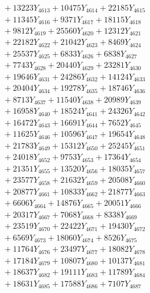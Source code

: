 \documentclass[a4paper,10pt]{article}
\begin{document}
{\begin{align}
&\;  + 13223 Y_{4613} + 10475 Y_{4614} + 22185 Y_{4615} \\[0.3ex]
&\;  + 11345 Y_{4616} + 9371 Y_{4617} + 18115 Y_{4618} \\[0.5ex]\allowbreak
&\;  + 9812 Y_{4619} + 25560 Y_{4620} + 12312 Y_{4621} \\[0.3ex]
&\;  + 22182 Y_{4622} + 21042 Y_{4623} + 8469 Y_{4624} \\[0.3ex]
&\;  + 25537 Y_{4625} + 6833 Y_{4626} + 6838 Y_{4627} \\[0.3ex]
&\;  + 7743 Y_{4628} + 20440 Y_{4629} + 23281 Y_{4630} \\[0.3ex]
&\;  + 19646 Y_{4631} + 24286 Y_{4632} + 14124 Y_{4633} \\[0.3ex]
&\;  + 20404 Y_{4634} + 19278 Y_{4635} + 18746 Y_{4636} \\[0.3ex]
&\;  + 8713 Y_{4637} + 11540 Y_{4638} + 20989 Y_{4639} \\[0.3ex]
&\;  + 16958 Y_{4640} + 18524 Y_{4641} + 24326 Y_{4642} \\[0.3ex]
&\;  + 16472 Y_{4643} + 16691 Y_{4644} + 7652 Y_{4645} \\[0.3ex]
&\;  + 11625 Y_{4646} + 10596 Y_{4647} + 19654 Y_{4648} \\[0.5ex]\allowbreak
&\;  + 21783 Y_{4649} + 15312 Y_{4650} + 25245 Y_{4651} \\[0.3ex]
&\;  + 24018 Y_{4652} + 9753 Y_{4653} + 17364 Y_{4654} \\[0.3ex]
&\;  + 21351 Y_{4655} + 13520 Y_{4656} + 18035 Y_{4657} \\[0.3ex]
&\;  + 23577 Y_{4658} + 21632 Y_{4659} + 20508 Y_{4660} \\[0.3ex]
&\;  + 20877 Y_{4661} + 10833 Y_{4662} + 21877 Y_{4663} \\[0.3ex]
&\;  + 6606 Y_{4664} + 14876 Y_{4665} + 20051 Y_{4666} \\[0.3ex]
&\;  + 20317 Y_{4667} + 7068 Y_{4668} + 8338 Y_{4669} \\[0.3ex]
&\;  + 23519 Y_{4670} + 22422 Y_{4671} + 19430 Y_{4672} \\[0.3ex]
&\;  + 6569 Y_{4673} + 18060 Y_{4674} + 8526 Y_{4675} \\[0.3ex]
&\;  + 11764 Y_{4676} + 23497 Y_{4677} + 18082 Y_{4678} \\[0.5ex]\allowbreak
&\;  + 17184 Y_{4679} + 10807 Y_{4680} + 10137 Y_{4681} \\[0.3ex]
&\;  + 18637 Y_{4682} + 19111 Y_{4683} + 11789 Y_{4684} \\[0.3ex]
&\;  + 18631 Y_{4685} + 17588 Y_{4686} + 7107 Y_{4687} \\[0.3ex]

\end{align}}
\end{document}
